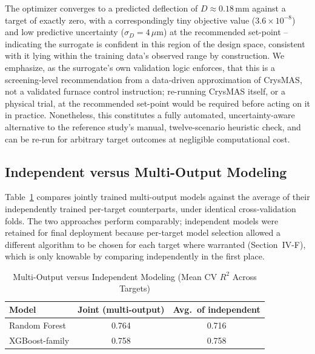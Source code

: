 \documentclass[conference]{IEEEtran}
\begin{document}
The optimizer converges to a predicted deflection of $D\approx0.18\,$mm against a target of exactly zero, with a correspondingly tiny objective value ($3.6\times10^{-8}$) and low predictive uncertainty ($\sigma_D=4\,\mu$m) at the recommended set-point -- indicating the surrogate is confident in this region of the design space, consistent with it lying within the training data's observed range by construction. We emphasize, as the surrogate's own validation logic enforces, that this is a screening-level recommendation from a data-driven approximation of CrysMAS, not a validated furnace control instruction; re-running CrysMAS itself, or a physical trial, at the recommended set-point would be required before acting on it in practice. Nonetheless, this constitutes a fully automated, uncertainty-aware alternative to the reference study's manual, twelve-scenario heuristic check, and can be re-run for arbitrary target outcomes at negligible computational cost.

\subsection{Independent versus Multi-Output Modeling}
Table~\ref{tab:multioutput} compares jointly trained multi-output models against the average of their independently trained per-target counterparts, under identical cross-validation folds. The two approaches perform comparably; independent models were retained for final deployment because per-target model selection allowed a different algorithm to be chosen for each target where warranted (Section~IV-F), which is only knowable by comparing independently in the first place.

\begin{table}[!t]
\caption{Multi-Output versus Independent Modeling (Mean CV $R^2$ Across Targets)}
\label{tab:multioutput}
\centering
\begin{tabular}{@{}lcc@{}}
\toprule
\textbf{Model} & \textbf{Joint (multi-output)} & \textbf{Avg.\ of independent} \\
\midrule
Random Forest & 0.764 & 0.716 \\
XGBoost-family & 0.758 & 0.758 \\
\bottomrule
\end{tabular}
\end{table}

\end{document}
